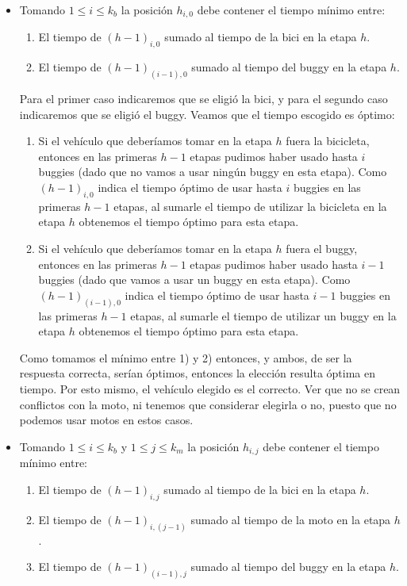 \begin{itemize}
\begin{itemize}
		\item Tomando $1\leq i \leq k_{b}$ la posición $h_{i,0}$ debe contener el tiempo mínimo entre:
		\begin{enumerate}
			\item El tiempo de $(h-1)_{i,0}$ sumado al tiempo de la bici en la etapa $h$.
			\item El tiempo de $(h-1)_{(i-1),0}$ sumado al tiempo del buggy en la etapa $h$.
		\end{enumerate} 
		Para el primer caso indicaremos que se eligió la bici, y para el segundo caso indicaremos que se eligió el buggy. Veamos que el tiempo escogido es óptimo:
		\begin{enumerate}
			\item Si el vehículo que deberíamos tomar en la etapa $h$ fuera la bicicleta, entonces en las primeras $h-1$ etapas pudimos haber usado hasta $i$ buggies (dado que no vamos a usar ningún buggy en esta etapa).  Como $(h-1)_{i,0}$ indica el tiempo óptimo de usar hasta $i$ buggies en las primeras $h-1$ etapas, al sumarle el tiempo de utilizar la bicicleta en la etapa $h$ obtenemos el tiempo óptimo para esta etapa.
			\item Si el vehículo que deberíamos tomar en la etapa $h$ fuera el buggy, entonces en las primeras $h-1$ etapas pudimos haber usado hasta $i-1$ buggies (dado que vamos a usar un buggy en esta etapa).  Como $(h-1)_{(i-1),0}$ indica el tiempo óptimo de usar hasta $i-1$ buggies en las primeras $h-1$ etapas, al sumarle el tiempo de utilizar un buggy en la etapa $h$ obtenemos el tiempo óptimo para esta etapa.
		\end{enumerate}
		Como tomamos el mínimo entre 1) y 2) entonces, y ambos, de ser la respuesta correcta, serían óptimos, entonces la elección resulta óptima en tiempo. Por esto mismo, el vehículo elegido es el correcto. Ver que no se crean conflictos con la moto, ni tenemos que considerar elegirla o no, puesto que no podemos usar motos en estos casos.
		\item Tomando $1 \leq i \leq k_{b}$ y $1 \leq j \leq k_{m}$ la posición $h_{i,j}$ debe contener el tiempo mínimo entre:
		\begin{enumerate}
			\item El tiempo de $(h-1)_{i,j}$ sumado al tiempo de la bici en la etapa $h$.
			\item El tiempo de $(h-1)_{i,(j-1)}$ sumado al tiempo de la moto en la etapa $h$.
			\item El tiempo de $(h-1)_{(i-1),j}$ sumado al tiempo del buggy en la etapa $h$.

\end{enumerate}
\end{itemize}
\end{itemize}
